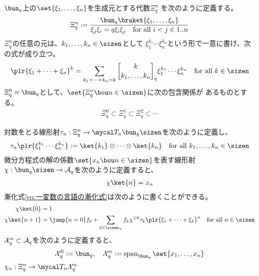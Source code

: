 {	$\bun_q$上の$\set{\xi_1,\dots,\xi_n}$を生成元とする代数$\Xi_q^n$
	を次のように定義する。
	\begin{equation*}\begin{split}
		\Xi_q^n := \frac{\bun_q\braket{\xi_1,\dots,\xi_n}}
		{\xi_j\xi_i=q\xi_i\xi_j \quad\text{for all } i<j\in1..n}
	\end{split}\end{equation*}
	$\Xi_q^n$の任意の元は、$k_1,\dots,k_n\in\sizen$として
	$\xi_1^{k_1}\cdots\xi_n^{k_n}$という形で一意に書け、次の式が成り立つ。
	\begin{equation*}\begin{split}
		\plr{\xi_1+\cdots+\xi_n}^k = \sum_{k_1+\cdots+k_n=k}
			\qbinom{k}{k_1,\dots,k_n}_q \xi_1^{k_1}\cdots\xi_n^{k_n}
			\quad\text{for all } k\in\sizen
	\end{split}\end{equation*}
	$\Xi_q^0=\bun_q$として、$\set{\Xi_q^n\bou n\in\sizen}$に次の包含関係が
	あるものとする。
	\begin{equation*}\begin{split}
		\Xi_q^0\subset \Xi_q^1\subset \Xi_q^2\subset\cdots
	\end{split}\end{equation*}

	対数をとる線形射$\tau_n:\Xi_q^n\to\T_n\bun_q\sizen$を次のように定義し、
	\begin{equation*}\begin{split}
		\tau_n\plr{\xi_1^{k_1}\cdots\xi_n^{k_n}} 
		:= \ket{k_1}\otimes\cdots\otimes\ket{k_n}
		\quad\text{for all } k_1,\dots,k_n\in\sizen
	\end{split}\end{equation*}
	微分方程式の解の係数$\set{x_n\bou n\in\sizen}$を表す線形射
	$\chi:\bun_q\sizen\to\calA_q$を次のように定義すると、
	\begin{equation*}\begin{split}
		\chi\ket{n} = x_n
	\end{split}\end{equation*}
	漸化式\eqref{eq:一変数の言語の漸化式}は次のように書くことができる。
	\begin{equation*}\begin{split}
		\chi\ket{0} &= 1 \\
		\chi\ket{n+1} &= \jump{n=0}f_0 + \sum_{k\in\sizen_+} f_k
			\chi^{\otimes k}\tau_k\plr{\xi_1+\cdots+\xi_k}^n
			\quad\text{for all } n\in\sizen \\
	\end{split}\end{equation*}
	$\mathcal{X}_q^n\subset\mathcal{A}_q$を次のように定義すると、
	\begin{equation*}\begin{split}
		\calX_q^0 := \bun_q,\quad
		\calX_q^n := \op{span}_{\bun_q}\set{x_1,\dots,x_n}
	\end{split}\end{equation*}
	$\chi_n:\Xi_q^n\to\T_n\calX_q^n$

}
